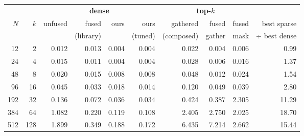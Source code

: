 \begin{tabular}{rrrrrrrrrr}
\toprule
& & \multicolumn{4}{c}{\textbf{dense}} & \multicolumn{3}{c}{\textbf{top-$k$}} & \\
\cmidrule(lr){3-6}\cmidrule(lr){7-9}
$N$ & $k$ & unfused & fused & ours & ours & gathered & fused & fused & best sparse \\
& & & (library) & & (tuned) & (composed) & gather & mask & $\div$ best dense \\
\midrule
12 & 2 & 0.012 & 0.013 & 0.004 & 0.004 & 0.022 & 0.004 & 0.006 & 0.99 \\
24 & 4 & 0.015 & 0.011 & 0.004 & 0.004 & 0.028 & 0.006 & 0.016 & 1.37 \\
48 & 8 & 0.020 & 0.015 & 0.008 & 0.008 & 0.048 & 0.012 & 0.024 & 1.54 \\
96 & 16 & 0.045 & 0.033 & 0.018 & 0.014 & 0.120 & 0.049 & 0.039 & 2.80 \\
192 & 32 & 0.136 & 0.072 & 0.036 & 0.034 & 0.424 & 0.387 & 2.305 & 11.29 \\
384 & 64 & 1.082 & 0.220 & 0.119 & 0.108 & 2.405 & 2.750 & 2.025 & 18.70 \\
512 & 128 & 1.899 & 0.349 & 0.188 & 0.172 & 6.435 & 7.214 & 2.662 & 15.44 \\
\bottomrule
\end{tabular}%
